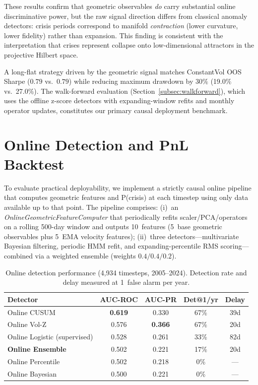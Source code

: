 These results confirm that geometric observables \emph{do} carry
substantial online discriminative power, but the raw signal direction
differs from classical anomaly detectors: crisis periods correspond
to manifold \emph{contraction} (lower curvature, lower fidelity)
rather than expansion.  This finding is consistent with the
interpretation that crises represent collapse onto low-dimensional
attractors in the projective Hilbert space.

A long-flat strategy driven by the geometric signal matches ConstantVol
OOS Sharpe ($0.79$ vs.\ $0.79$) while reducing maximum drawdown by
$30\%$ (19.0\% vs.\ 27.0\%).  The walk-forward evaluation
(Section~\ref{subsec:walkforward}), which uses the offline z-score
detectors with expanding-window refits and monthly operator updates,
constitutes our primary causal deployment benchmark.



\section{Online Detection and PnL Backtest}\label{sec:online_appendix}

To evaluate practical deployability, we implement a strictly causal online
pipeline that computes geometric features and P(crisis) at each timestep
using only data available up to that point.  The pipeline comprises: (i)~an
\emph{OnlineGeometricFeatureComputer} that periodically refits
scaler/PCA/operators on a rolling 500-day window and outputs 10~features
(5~base geometric observables plus 5~EMA velocity features); (ii)~three
detectors---multivariate Bayesian filtering, periodic HMM refit, and
expanding-percentile RMS scoring---combined via a weighted ensemble
(weights $0.4/0.4/0.2$).

\begin{table}[htb]
\centering
\caption{Online detection performance (4,934 timesteps, 2005--2024).
  Detection rate and delay measured at 1~false alarm per year.}
\label{tab:online_detection}
\small
\begin{tabular}{lcccc}
\toprule
Detector & AUC-ROC & AUC-PR & Det@1/yr & Delay \\
\midrule
Online CUSUM                 & \textbf{0.619} & 0.330 & 67\% & 39d \\
Online Vol-Z                 & 0.576 & \textbf{0.366} & 67\% & 20d \\
Online Logistic (supervised) & 0.528 & 0.261 & 33\% & 82d \\
\textbf{Online Ensemble}     & 0.502 & 0.221 & 17\% & 20d \\
Online Percentile            & 0.502 & 0.218 &  0\% & --- \\
Online Bayesian              & 0.500 & 0.221 &  0\% & --- \\
\bottomrule
\end{tabular}
\end{table}


